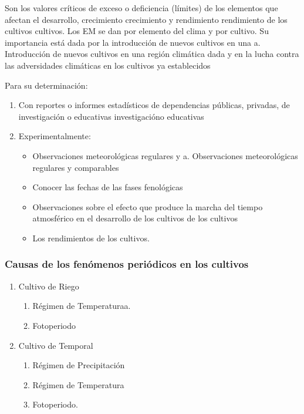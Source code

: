\begin{definition}
    Son los valores críticos de exceso o deficiencia (límites) de los elementos que afectan el desarrollo, crecimiento crecimiento y rendimiento rendimiento de los cultivos cultivos. Los EM se dan por elemento del clima y por cultivo.
    Su importancia está dada por la introducción de nuevos cultivos en una a. Introducción de nuevos cultivos en una región climática dada y en la lucha contra las adversidades climáticas en los cultivos ya establecidos
\end{definition}

Para su determinación:

\begin{enumerate}
    \item Con reportes o informes estadísticos de dependencias públicas, privadas, de investigación o educativas investigacióno educativas
    \item Experimentalmente: \begin{itemize}
        \item Observaciones meteorológicas regulares y a. Observaciones meteorológicas regulares y comparables
        \item Conocer las fechas de las fases fenológicas
        \item Observaciones sobre el efecto que produce la marcha del tiempo atmosférico en el desarrollo de los cultivos de los cultivos
        \item Los rendimientos de los cultivos.
    \end{itemize}
\end{enumerate}


\subsubsection{Causas de los fenómenos periódicos en los cultivos}

\begin{enumerate}
    \item Cultivo de Riego \begin{enumerate}
        \item Régimen de Temperaturaa.
        \item Fotoperiodo
    \end{enumerate}
    \item Cultivo de Temporal \begin{enumerate}
        \item Régimen de Precipitación
        \item Régimen de Temperatura
        \item Fotoperiodo.
    \end{enumerate}
\end{enumerate}

